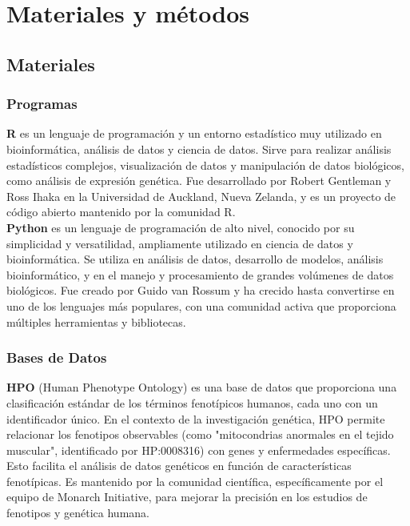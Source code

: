 \section{Materiales y métodos}


\subsection{\textbf{Materiales}}

\subsubsection{Programas}
 

	\textbf{R} es un lenguaje de programación y un entorno estadístico muy utilizado en bioinformática, análisis de datos y ciencia de datos.
Sirve para realizar análisis estadísticos complejos, visualización de datos y manipulación de datos biológicos, como análisis de expresión genética.
Fue desarrollado por Robert Gentleman y Ross Ihaka en la Universidad de Auckland, Nueva Zelanda, y es un proyecto de código abierto mantenido por la comunidad R.\\


\textbf{Python} es un lenguaje de programación de alto nivel, conocido por su simplicidad y versatilidad, ampliamente utilizado en ciencia de datos y bioinformática.
Se utiliza en análisis de datos, desarrollo de modelos, análisis bioinformático, y en el manejo y procesamiento de grandes volúmenes de datos biológicos.
Fue creado por Guido van Rossum y ha crecido hasta convertirse en uno de los lenguajes más populares, con una comunidad activa que proporciona múltiples herramientas y bibliotecas.
\subsubsection{Bases de Datos}


\textbf{HPO} (Human Phenotype Ontology) es una base de datos que proporciona una clasificación estándar de los términos fenotípicos humanos, cada uno con un identificador único.
En el contexto de la investigación genética, HPO permite relacionar los fenotipos observables (como "mitocondrias anormales en el tejido muscular", identificado por HP:0008316) con genes y enfermedades específicas. Esto facilita el análisis de datos genéticos en función de características fenotípicas.
Es mantenido por la comunidad científica, específicamente por el equipo de Monarch Initiative, para mejorar la precisión en los estudios de fenotipos y genética humana.\\




